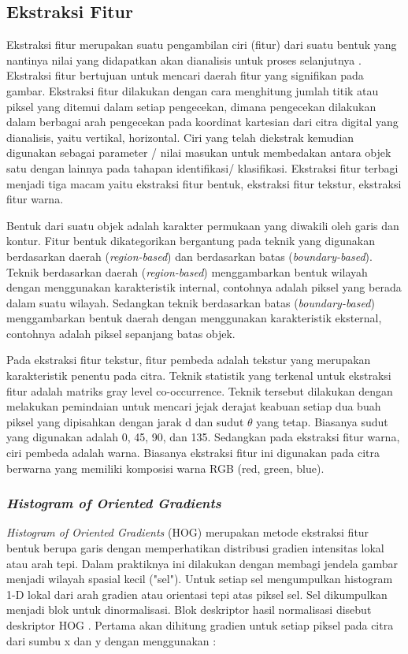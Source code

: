 \subsection{Ekstraksi Fitur}
Ekstraksi fitur merupakan suatu pengambilan ciri (fitur) dari suatu bentuk yang nantinya nilai yang didapatkan akan dianalisis untuk proses selanjutnya \cite{gonzalez}. Ekstraksi fitur bertujuan untuk mencari daerah fitur yang signifikan pada gambar. Ekstraksi fitur dilakukan dengan cara menghitung jumlah titik atau piksel yang ditemui dalam setiap pengecekan, dimana pengecekan dilakukan dalam berbagai arah pengecekan pada koordinat kartesian dari citra digital yang dianalisis, yaitu vertikal, horizontal. Ciri yang telah diekstrak kemudian digunakan sebagai parameter / nilai masukan untuk membedakan antara objek satu dengan lainnya pada tahapan identifikasi/ klasifikasi. Ekstraksi fitur terbagi menjadi tiga macam yaitu ekstraksi fitur bentuk, ekstraksi fitur tekstur, ekstraksi fitur warna.

Bentuk dari suatu objek adalah karakter permukaan yang diwakili oleh garis dan kontur. Fitur bentuk dikategorikan bergantung pada teknik yang digunakan berdasarkan daerah (\textit{region-based}) dan berdasarkan batas (\textit{boundary-based}). Teknik berdasarkan daerah (\textit{region-based}) menggambarkan bentuk wilayah dengan menggunakan karakteristik internal, contohnya adalah piksel yang berada dalam suatu wilayah. Sedangkan teknik berdasarkan batas (\textit{boundary-based}) menggambarkan bentuk daerah dengan menggunakan karakteristik eksternal, contohnya adalah piksel sepanjang batas objek.

Pada ekstraksi fitur tekstur, fitur pembeda adalah tekstur yang merupakan karakteristik penentu pada citra. Teknik statistik yang terkenal untuk ekstraksi fitur adalah matriks gray level co-occurrence. Teknik tersebut dilakukan dengan melakukan pemindaian untuk mencari jejak derajat keabuan setiap dua buah piksel yang dipisahkan dengan jarak d dan sudut $\theta$ yang tetap. Biasanya sudut yang digunakan adalah 0, 45, 90, dan 135. Sedangkan pada ekstraksi fitur warna, ciri pembeda adalah warna. Biasanya ekstraksi fitur ini digunakan pada citra berwarna yang memiliki komposisi warna RGB (red, green, blue).
\\

\subsubsection{\textit{Histogram of Oriented Gradients}}
\textit{Histogram of Oriented Gradients} (HOG) merupakan metode ekstraksi fitur bentuk berupa garis dengan memperhatikan distribusi gradien intensitas lokal atau arah tepi. Dalam praktiknya ini dilakukan dengan membagi jendela gambar menjadi wilayah spasial kecil ("sel"). Untuk setiap sel mengumpulkan histogram 1-D lokal dari arah gradien atau orientasi tepi atas piksel sel. Sel dikumpulkan menjadi blok untuk dinormalisasi. Blok deskriptor hasil normalisasi disebut deskriptor HOG \cite{dalal}. Pertama akan dihitung gradien untuk setiap piksel pada citra dari sumbu x dan y dengan menggunakan : 

